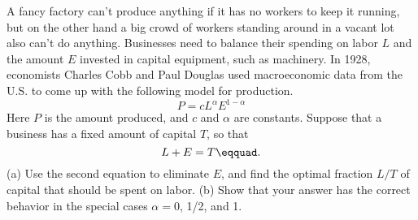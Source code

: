 A fancy factory can't produce anything if it has no workers
to keep it running, but on the other hand a big crowd of
workers standing around in a vacant lot also can't do anything.
Businesses need to balance their spending on labor $L$ and
the amount $E$ invested in capital equipment, such as machinery. In 1928, economists
Charles Cobb and Paul Douglas used macroeconomic data from
the U.S. to come up with the following model for production.
\begin{equation*}
  P = cL^\alpha E^{1-\alpha}
\end{equation*}
Here $P$ is the amount produced, and $c$ and $\alpha$ are constants.
Suppose that a business has a fixed amount of capital $T$, so that
\begin{equation*}
  L+E = T\eqquad.
\end{equation*}
(a) Use the second equation to eliminate $E$, and find the optimal
fraction $L/T$ of capital that should be spent on labor.
(b) Show that your answer has the correct behavior in the special
cases $\alpha=0$, 1/2, and 1.\answercheck

